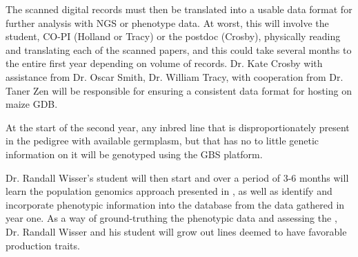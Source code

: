 \documentclass[12pt]{article}
\begin{document}
The scanned digital records must then be translated into a usable data format for further analysis with NGS or phenotype data. At worst, this will involve the student, CO-PI (Holland or Tracy) or the postdoc (Crosby), physically reading and translating each of the scanned papers, and this could take several months to the entire first year depending on volume of records. 
Dr. Kate Crosby with assistance from Dr. Oscar Smith, Dr. William Tracy, with cooperation from Dr. Taner Zen will be responsible for ensuring a consistent data format for hosting on maize GDB.

At the start of the second year, any inbred line that is disproportionately present in the pedigree with available germplasm, but that has no to little genetic information on it will be genotyped using the GBS platform. 

Dr. Randall Wisser's student will then start and over a period of 3-6 months will learn the population genomics approach presented in \citep{Berg:2014bs}, as well as identify and incorporate phenotypic information into the database from the data gathered in year one. 
As a way of ground-truthing the phenotypic data and assessing the , Dr. Randall Wisser and his student will grow out lines deemed to have favorable production traits.


\end{document}
